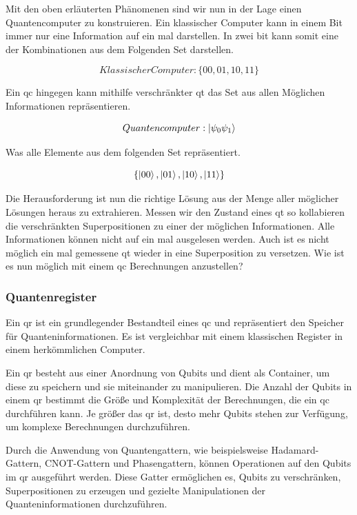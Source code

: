 Mit den oben erläuterten Phänomenen sind wir nun in der Lage einen Quantencomputer zu konstruieren. Ein klassischer Computer kann in einem Bit immer nur eine Information auf ein mal darstellen. In zwei bit kann somit eine der Kombinationen aus dem Folgenden Set darstellen.

\begin{equation}
    Klassischer Computer: \{00, 01, 10, 11\}
\end{equation}

Ein \ac{qc} hingegen kann mithilfe verschränkter \ac{qt} das Set aus allen Möglichen Informationen repräsentieren.

\begin{equation}
    Quantencomputer: \ket{\psi_0 \psi_1} 
\end{equation}

Was alle Elemente aus dem folgenden Set repräsentiert.

\begin{equation}
    \{ \ket{00}, \ket{01}, \ket{10}, \ket{11} \}
\end{equation} \cite[142]{steane_quantum_1998}

Die Herausforderung ist nun die richtige Lösung aus der Menge aller möglicher Lösungen heraus zu extrahieren. Messen wir den Zustand eines \ac{qt} so kollabieren die verschränkten Superpositionen zu einer der möglichen Informationen. Alle Informationen können nicht auf ein mal ausgelesen werden. Auch ist es nicht möglich ein mal gemessene \ac{qt} wieder in eine Superposition zu versetzen. Wie ist es nun möglich mit einem \ac{qc} Berechnungen anzustellen?

\subsubsection{Quantenregister}
Ein \ac{qr} ist ein grundlegender Bestandteil eines \ac{qc} und repräsentiert den Speicher für Quanteninformationen. Es ist vergleichbar mit einem klassischen Register in einem herkömmlichen Computer.

Ein \ac{qr} besteht aus einer Anordnung von Qubits und dient als Container, um diese zu speichern und sie miteinander zu manipulieren. Die Anzahl der Qubits in einem \ac{qr} bestimmt die Größe und Komplexität der Berechnungen, die ein \ac{qc} durchführen kann. Je größer das \ac{qr} ist, desto mehr Qubits stehen zur Verfügung, um komplexe Berechnungen durchzuführen.

Durch die Anwendung von Quantengattern, wie beispielsweise Hadamard-Gattern, CNOT-Gattern und Phasengattern, können Operationen auf den Qubits im \ac{qr} ausgeführt werden. Diese Gatter ermöglichen es, Qubits zu verschränken, Superpositionen zu erzeugen und gezielte Manipulationen der Quanteninformationen durchzuführen.

